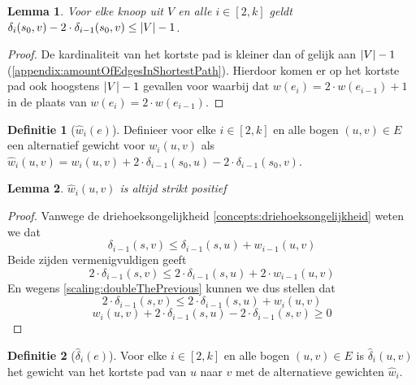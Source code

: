 \documentclass[conference]{IEEEtran}
\newtheorem{lemma}{Lemma}[section]
\theoremstyle{definition}
\newtheorem{definition}{Definitie}[section]
\theoremstyle{remark}
\DeclarePairedDelimiter{\card}{\vert}{\vert}  %
\begin{document}
\begin{lemma} \label{theorem:maxTheAmountOfVertices}
    Voor elke knoop uit $V$ en alle $i \in [2, k]$ geldt $\delta_i(s_0, v) - 2 \cdot \delta_{i-1}(s_0, v) \leq \card{V} -1$.
\end{lemma}
\begin{proof}
    De kardinaliteit van het kortste pad is kleiner dan of gelijk aan $\card{V} - 1$ (\ref{appendix:amountOfEdgesInShortestPath}). Hierdoor komen er op het kortste pad ook hoogstens $\card{V} - 1$ gevallen voor waarbij dat $w(e_i) = 2 \cdot w(e_{i-1}) + 1$ in de plaats van $w(e_i) = 2 \cdot w(e_{i-1})$.
\end{proof}

\begin{definition}[$\hat{w}_i(e)$]
    Definieer voor elke $i \in [2, k]$ en alle bogen $(u, v) \in E$ een alternatief gewicht voor $w_i(u, v)$ als $\hat{w}_i(u, v) = w_i(u, v) + 2 \cdot \delta_{i-1}(s_0, u) - 2 \cdot \delta_{i-1}(s_0, v)$.
\end{definition}

\begin{lemma}
    $\hat{w}_i(u, v)$ is altijd strikt positief
\end{lemma}
\begin{proof}
    Vanwege de driehoeksongelijkheid \ref{concepts:driehoeksongelijkheid} weten we dat
    \begin{displaymath}
        \delta_{i-1}(s, v) \leq \delta_{i-1}(s, u) + w_{i-1}(u, v)
    \end{displaymath}
    Beide zijden vermenigvuldigen geeft
    \begin{displaymath}
        2 \cdot \delta_{i-1}(s, v) \leq 2 \cdot \delta_{i-1}(s, u) + 2 \cdot w_{i-1}(u, v)
    \end{displaymath}
    En wegens \ref{scaling:doubleThePrevious} kunnen we dus stellen dat
    \begin{displaymath}
        2 \cdot \delta_{i-1}(s, v) \leq 2 \cdot \delta_{i-1}(s, u) + w_i(u, v)
    \end{displaymath}
    \begin{displaymath}
        w_i(u, v) + 2 \cdot \delta_{i-1}(s, u) - 2 \cdot \delta_{i-1}(s, v) \geq 0
    \end{displaymath}
\end{proof}

\begin{definition}[$\hat{\delta}_i(e)$]
    Voor elke $i \in [2, k]$ en alle bogen $(u, v) \in E$ is $\hat{\delta}_i(u, v)$ het gewicht van het kortste pad van $u$ naar $v$ met de alternatieve gewichten $\hat{w}_i$.
\end{definition}
\end{document}
